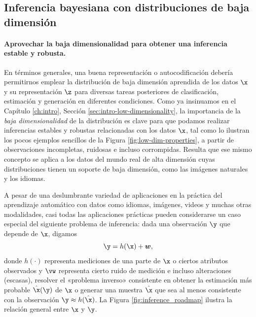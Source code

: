 \documentclass[../../book-main_es.tex]{subfiles}
\begin{document}
\subsection{Inferencia bayesiana con distribuciones de baja dimensión}
\paragraph{Aprovechar la baja dimensionalidad para obtener una inferencia estable y robusta.}
En términos generales, una buena representación o autocodificación debería
permitirnos emplear la distribución de baja dimensión aprendida de los
datos $\x$ y su representación $\z$ para diversas tareas posteriores
de clasificación, estimación y generación en diferentes
condiciones. Como ya insinuamos en el Capítulo \ref{ch:intro}, 
Sección \ref{sec:intro-low-dimensionality}, la importancia de la
{\em baja dimensionalidad} de la distribución es clave para que podamos
realizar inferencias estables y robustas relacionadas con los datos $\x$, tal como
lo ilustran los pocos ejemplos sencillos de la Figura
\ref{fig:low-dim-properties}, a partir de observaciones incompletas, ruidosas e incluso
corrompidas. Resulta que ese mismo concepto
se aplica a los datos del mundo real de alta dimensión cuyas distribuciones
tienen un soporte de baja dimensión, como las imágenes naturales y los idiomas.

A pesar de una deslumbrante variedad de aplicaciones en la práctica del aprendizaje automático
con datos como idiomas, imágenes, videos y muchas otras
modalidades, casi todas las aplicaciones prácticas pueden considerarse un
caso especial del siguiente problema de inferencia: dada una observación
$\y$ que depende de $\x$, digamos
\begin{equation}
    \y = h(\x) + \boldsymbol{w},
\end{equation}
donde $h(\cdot)$ representa mediciones de una parte de $\x$ o ciertos
atributos observados y $\vw$ representa cierto ruido de medición e
incluso alteraciones (escasas), resolver el «problema inverso» consistente en obtener
la estimación más probable $\hat \x(\y)$ de $\x$ o generar una muestra
$\hat{\x}$ que sea al menos consistente con la observación $\y
\approx h(\hat{\x})$. La Figura \ref{fig:inference_roadmap} ilustra
la relación general entre $\x$ y $\y$.
\end{document}
